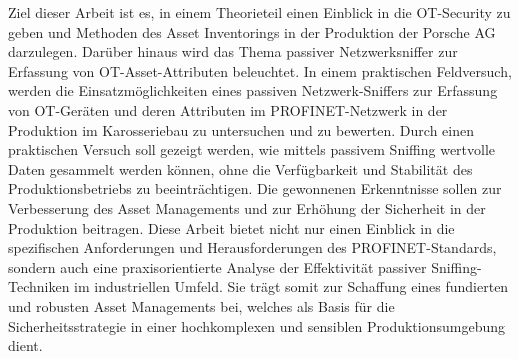 Ziel dieser Arbeit ist es, in einem Theorieteil einen Einblick in die OT-Security zu geben und Methoden des Asset Inventorings in der Produktion der Porsche AG darzulegen. Darüber hinaus wird das Thema passiver Netzwerksniffer zur Erfassung von OT-Asset-Attributen beleuchtet. In einem praktischen Feldversuch, werden die Einsatzmöglichkeiten eines passiven Netzwerk-Sniffers zur Erfassung von OT-Geräten und deren Attributen im PROFINET-Netzwerk in der Produktion im Karosseriebau zu untersuchen und zu bewerten. Durch einen praktischen Versuch soll gezeigt werden, wie mittels passivem Sniffing wertvolle Daten gesammelt werden können, ohne die Verfügbarkeit und Stabilität des Produktionsbetriebs zu beeinträchtigen. Die gewonnenen Erkenntnisse sollen zur Verbesserung des Asset Managements und zur Erhöhung der Sicherheit in der Produktion beitragen.
Diese Arbeit bietet nicht nur einen Einblick in die spezifischen Anforderungen und Herausforderungen des PROFINET-Standards, sondern auch eine praxisorientierte Analyse der Effektivität passiver Sniffing-Techniken im industriellen Umfeld. Sie trägt somit zur Schaffung eines fundierten und robusten Asset Managements bei, welches als Basis für die Sicherheitsstrategie in einer hochkomplexen und sensiblen Produktionsumgebung dient.
